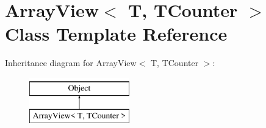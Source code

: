\hypertarget{classArrayView}{}\section{Array\+View$<$ T, T\+Counter $>$ Class Template Reference}
\label{classArrayView}
Inheritance diagram for Array\+View$<$ T, T\+Counter $>$\+:\begin{figure}[H]
\begin{center}
\leavevmode
\includegraphics[height=2.000000cm]{classArrayView}
\end{center}
\end{figure}
